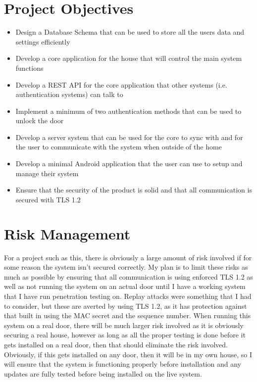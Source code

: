 \documentclass[10pt, a4paper]{article}
\begin{document}
\cite{Lackner2013}

\section{Project Objectives}
\begin{itemize}
	\item Design a Database Schema that can be used to store all the users data and settings efficiently
	\item Develop a core application for the house that will control the main system functions
	\item Develop a REST API for the core application that other systems (i.e. authentication systems) can talk to
	\item Implement a minimum of two authentication methods that can be used to unlock the door
	\item Develop a server system that can be used for the core to sync with and for the user to communicate with the system when outside of the home
	\item Develop a minimal Android application that the user can use to setup and manage their system
	\item Ensure that the security of the product is solid and that all communication is secured with TLS 1.2
\end{itemize}

\section{Risk Management}
For a project such as this, there is obviously a large amount of risk involved if for some reason the system isn't secured correctly. My plan is to limit these risks as much as possible by ensuring that all communication is using enforced TLS 1.2 as well as not running the system on an actual door until I have a working system that I have run penetration testing on. Replay attacks were something that I had to consider, but these are averted by using TLS 1.2, as it has protection against that built in using the MAC secret and the sequence number. When running this system on a real door, there will be much larger risk involved as it is obviously securing a real house, however as long as all the proper testing is done before it gets installed on a real door, then that should eliminate the risk involved. Obviously, if this gets installed on any door, then it will be in my own house, so I will ensure that the system is functioning properly before installation and any updates are fully tested before being installed on the live system.
\end{document}
